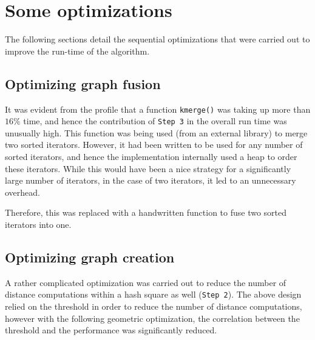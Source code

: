 \section{Some optimizations}
The following sections detail the sequential optimizations that were carried out to improve the run-time of the algorithm.
\subsection{Optimizing graph fusion}
It was evident from the profile that a function \texttt{kmerge()} was taking up more than \begin{math} 16\% \end{math} time, and hence the contribution of \texttt{Step 3} in the overall run time was unusually high. This function was being used (from an external library) to merge two sorted iterators. However, it had been written to be used for any number of sorted iterators, and hence the implementation internally used a heap to order these iterators. While this would have been a nice strategy for a significantly large number of iterators, in the case of two iterators, it led to an unnecessary overhead.

Therefore, this was replaced with a handwritten function to fuse two sorted iterators into one.

\subsection{Optimizing graph creation}
A rather complicated optimization was carried out to reduce the number of distance computations within a hash square as well (\texttt{Step 2}). The above design relied on the threshold in order to reduce the number of distance computations, however with the following geometric optimization, the correlation between the threshold and the performance was significantly reduced.

